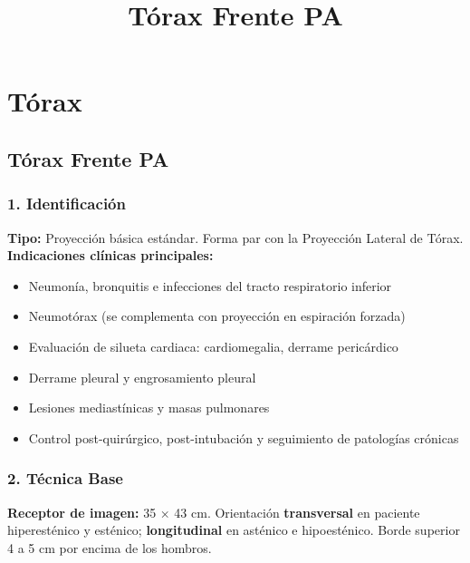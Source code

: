 \documentclass[9pt,a4paper,twocolumn,twoside]{tau-class/tau}
\title{Tórax Frente PA}
\begin{document}
	
	\maketitle
	\thispagestyle{firststyle}
	
	\section{Tórax}
	
	\subsection{Tórax Frente PA}
	
	\subsubsection*{1. Identificación}
	
	\textbf{Tipo:} Proyección básica estándar. Forma par con la Proyección Lateral de Tórax.\\
	
	\textbf{Indicaciones clínicas principales:}
	\begin{itemize}
		\item Neumonía, bronquitis e infecciones del tracto respiratorio inferior
		\item Neumotórax (se complementa con proyección en espiración forzada)
		\item Evaluación de silueta cardiaca: cardiomegalia, derrame pericárdico
		\item Derrame pleural y engrosamiento pleural
		\item Lesiones mediastínicas y masas pulmonares
		\item Control post-quirúrgico, post-intubación y seguimiento de patologías crónicas
	\end{itemize}
	
	\subsubsection*{2. Técnica Base}
	
	\textbf{Receptor de imagen:} 35 × 43 cm. Orientación \textbf{transversal} en paciente hiperesténico y esténico; \textbf{longitudinal} en asténico e hipoesténico. Borde superior 4 a 5 cm por encima de los hombros.
	
\end{document}
